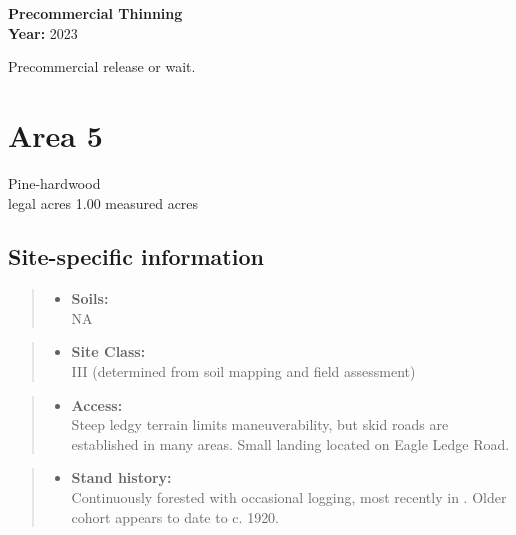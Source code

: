 \documentclass[]{tufte-handout}
\providecommand{\tightlist}{%
  \setlength{\itemsep}{0pt}\setlength{\parskip}{0pt}}
\begin{document}
\textbf{Precommercial Thinning}\\
\noindent \textbf{Year:} 2023

Precommercial release or wait.

\newpage

\section{Area 5}\label{area-5}

Pine-hardwood\\
 legal acres \textbar{} 1.00 measured acres

\subsection{Site-specific
information}\label{site-specific-information-4}

\begin{quote}
\begin{itemize}
\tightlist
\item
  \textbf{Soils:}\\
  \indent\indent  NA
\end{itemize}
\end{quote}

\begin{quote}
\begin{itemize}
\tightlist
\item
  \textbf{Site Class:}\\
  \vspace{2pt} III (determined from soil mapping and field assessment)
\end{itemize}
\end{quote}

\begin{quote}
\begin{itemize}
\tightlist
\item
  \textbf{Access:}\\
  \vspace{2pt} Steep ledgy terrain limits maneuverability, but skid
  roads are established in many areas. Small landing located on Eagle
  Ledge Road.
\end{itemize}
\end{quote}

\begin{quote}
\begin{itemize}
\tightlist
\item
  \textbf{Stand history:}\\
  \vspace{2pt} Continuously forested with occasional logging, most
  recently in . Older cohort appears to date to c. 1920.
\end{itemize}
\end{quote}
\end{document}
